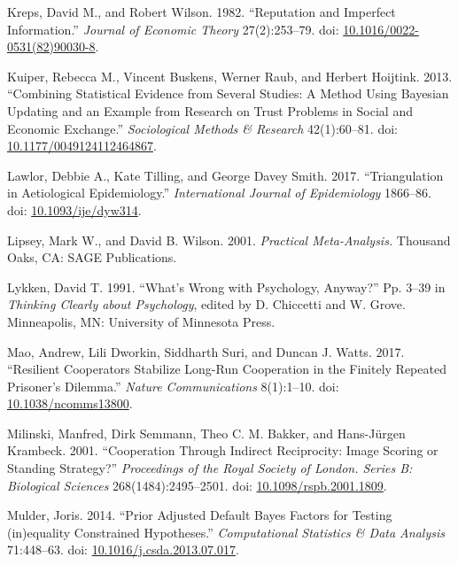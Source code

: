 \documentclass[
  11pt,
]{article}
\newlength{\cslhangindent}
\newlength{\cslentryspacingunit} %
\newenvironment{CSLReferences}[2] %
 {%
  \setlength{\parindent}{0pt}
  \ifodd #1
  \let\oldpar\par
  \def\par{\hangindent=\cslhangindent\oldpar}
  \fi
  \setlength{\parskip}{#2\cslentryspacingunit}
 }%
 {}
\begin{document}
\begin{CSLReferences}{1}{0}
\leavevmode{}%
Kreps, David M., and Robert Wilson. 1982. {``Reputation and Imperfect Information.''} \emph{Journal of Economic Theory} 27(2):253--79. doi: \href{https://doi.org/10.1016/0022-0531(82)90030-8}{10.1016/0022-0531(82)90030-8}.

\leavevmode{}%
Kuiper, Rebecca M., Vincent Buskens, Werner Raub, and Herbert Hoijtink. 2013. {``Combining Statistical Evidence from Several Studies: A Method Using Bayesian Updating and an Example from Research on Trust Problems in Social and Economic Exchange.''} \emph{Sociological Methods \& Research} 42(1):60--81. doi: \href{https://doi.org/10.1177/0049124112464867}{10.1177/0049124112464867}.

\leavevmode{}%
Lawlor, Debbie A., Kate Tilling, and George Davey Smith. 2017. {``Triangulation in Aetiological Epidemiology.''} \emph{International Journal of Epidemiology} 1866--86. doi: \href{https://doi.org/10.1093/ije/dyw314}{10.1093/ije/dyw314}.

\leavevmode{}%
Lipsey, Mark W., and David B. Wilson. 2001. \emph{Practical {M}eta-{A}nalysis.} Thousand Oaks, CA: SAGE Publications.

\leavevmode{}%
Lykken, David T. 1991. {``What's Wrong with Psychology, Anyway?''} Pp. 3--39 in \emph{Thinking {C}learly about {P}sychology}, edited by D. Chiccetti and W. Grove. Minneapolis, MN: University of Minnesota Press.

\leavevmode{}%
Mao, Andrew, Lili Dworkin, Siddharth Suri, and Duncan J. Watts. 2017. {``Resilient Cooperators Stabilize Long-Run Cooperation in the Finitely Repeated Prisoner's Dilemma.''} \emph{Nature Communications} 8(1):1--10. doi: \href{https://doi.org/10.1038/ncomms13800}{10.1038/ncomms13800}.

\leavevmode{}%
Milinski, Manfred, Dirk Semmann, Theo C. M. Bakker, and Hans-Jürgen Krambeck. 2001. {``Cooperation Through Indirect Reciprocity: Image Scoring or Standing Strategy?''} \emph{Proceedings of the Royal Society of London. Series B: Biological Sciences} 268(1484):2495--2501. doi: \href{https://doi.org/10.1098/rspb.2001.1809}{10.1098/rspb.2001.1809}.

\leavevmode{}%
Mulder, Joris. 2014. {``Prior Adjusted Default Bayes Factors for Testing (in)equality Constrained Hypotheses.''} \emph{Computational Statistics \& Data Analysis} 71:448--63. doi: \href{https://doi.org/10.1016/j.csda.2013.07.017}{10.1016/j.csda.2013.07.017}.


\end{CSLReferences}
\end{document}
